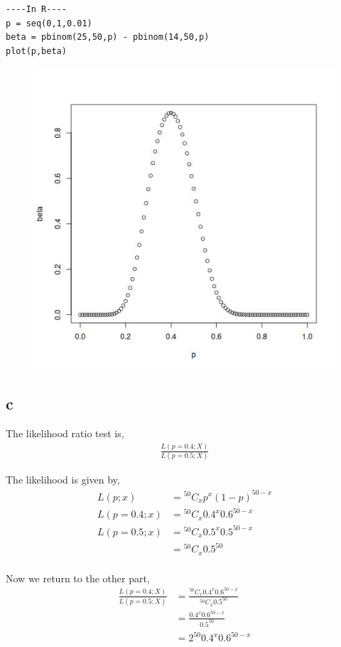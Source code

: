 \documentclass{article}
\begin{document}
\begin{verbatim}
----In R----
p = seq(0,1,0.01)
beta = pbinom(25,50,p) - pbinom(14,50,p)
plot(p,beta)
\end{verbatim}

\begin{figure}[h]
    \centering
    \includegraphics[width=\textwidth]{img/rplot.jpg}
\end{figure}

\subsection{c}
The likelihood ratio test is,
\begin{align*}
    \frac{L(p=0.4;X)}{L(p=0.5;X)}
\end{align*}

The likelihood is given by,
\begin{align*}
    L(p;x) &= {}^{50}C_x p^x (1-p)^{50-x} \\
    L(p=0.4;x) &= {}^{50}C_x 0.4^x 0.6^{50-x} \\
    L(p=0.5;x) &= {}^{50}C_x 0.5^x 0.5^{50-x} \\
    &= {}^{50}C_x 0.5^{50} \\
\end{align*}

Now we return to the other part,
\begin{align*}
    \frac{L(p=0.4;X)}{L(p=0.5;X)}
    &= \frac{{}^{50}C_x 0.4^x 0.6^{50-x}}
    {{}^{50}C_x 0.5^{50}} \\
    &= \frac{0.4^x 0.6^{50-x}}{0.5^{50}} \\
    &= 2^{50} 0.4^x 0.6^{50-x} \\
\end{align*}
\end{document}
